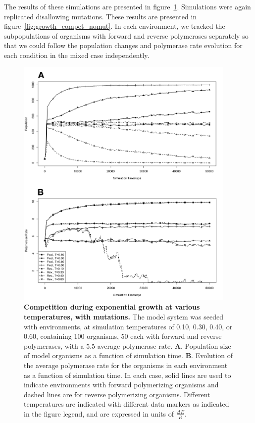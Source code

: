 The results of these simulations are presented in figure~\ref{fig:growth_compet_mut}. Simulations were again replicated disallowing mutations. These results are presented in figure~\ref{fig:growth_compet_nomut}. In each environment, we tracked the subpopulations of organisms with forward and reverse polymerases separately so that we could follow the population changes and polymerase rate evolution for each condition in the mixed case independently.

\begin{figure}[!ht]
	\begin{center}
		\includegraphics[width=0.95\textwidth]{growth_compet_mut}
	\end{center}
	\caption{
		{\bf Competition during exponential growth at various temperatures, with mutations.}  The model system was seeded with environments, at simulation temperatures of 0.10, 0.30, 0.40, or 0.60, containing 100 organisms, 50 each with forward and reverse polymerases, with a 5.5 average polymerase rate. \textbf{A}. Population size of model organisms as a function of simulation time. \textbf{B}. Evolution of the average polymerase rate for the organisms in each environment as a function of simulation time. In each case, solid lines are used to indicate environments with forward polymerizing organisms and dashed lines are for reverse polymerizing organisms. Different temperatures are indicated with different data markers as indicated in the figure legend, and are expressed in units of $\frac{\Delta E}{R}$.
		}
		\label{fig:growth_compet_mut}
\end{figure}

